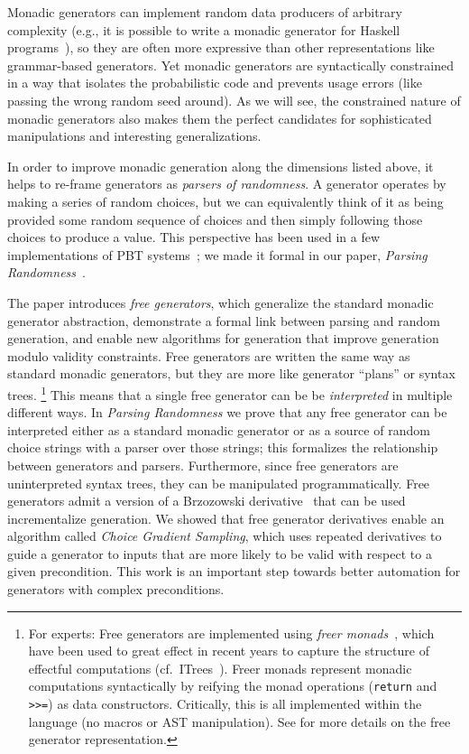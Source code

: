 Monadic generators can implement random data producers of arbitrary complexity
(e.g., it is possible to write a monadic generator for Haskell
programs~\cite{palka_testing_2011}), so they are often more expressive than
other representations like grammar-based generators.  Yet monadic generators are
syntactically constrained in a way that isolates the probabilistic code and
prevents usage errors (like passing the wrong random seed around). As we will
see, the constrained nature of monadic generators also makes them the perfect
candidates for sophisticated manipulations and interesting generalizations.

In order to improve monadic generation along the dimensions listed
above, it helps to re-frame generators as {\em parsers of randomness}. A generator
operates by making a series of random choices, but we can equivalently think of
it as being provided some random sequence of choices and then simply following
those choices to produce a value. This perspective has been used in a few
implementations of PBT
systems~\cite{maciver2019hypothesis, dolan2017testing}; we made it
formal in our paper, {\em Parsing Randomness}~\cite{goldstein2022parsing}.

The paper introduces {\em free generators}, which generalize the standard
monadic generator abstraction, demonstrate a formal link between parsing and
random generation, and enable new algorithms for generation that improve
generation modulo validity constraints. Free generators are written the same
way as standard monadic generators, but they are more like generator ``plans''
or syntax trees.%
\footnote{For experts: Free generators are implemented using {\em freer
monads}~\cite{kiselyov2015freer}, which have been used to great effect in recent
years to capture the structure of effectful computations
(cf.~ITrees~\cite{old:xia2019interaction}). Freer monads represent
monadic computations syntactically by reifying the monad operations
(\lstinline{return} and \lstinline{>>=}) as data constructors. Critically, this
is all implemented within the language (no macros or AST
manipulation). See \cite{goldstein2022parsing} for more details on the
free generator representation.}
This means that a single free generator can be be {\em interpreted} in multiple
different ways. In {\em Parsing Randomness} we prove that any free generator can
be interpreted either as a standard monadic generator or as a source of
random choice strings with a parser over those strings; this formalizes the
relationship between generators and parsers. Furthermore, since free generators
are uninterpreted syntax trees, they can be manipulated programmatically. Free
generators admit a version of a Brzozowski
derivative~\cite{brzozowski1964derivatives} that can be used incrementalize
generation. We showed that free generator derivatives enable an algorithm called
{\em Choice Gradient Sampling}, which uses repeated derivatives to guide a
generator to inputs that are more likely to be valid with respect to a given
precondition. This work is an important step towards better automation for
generators with complex preconditions.


